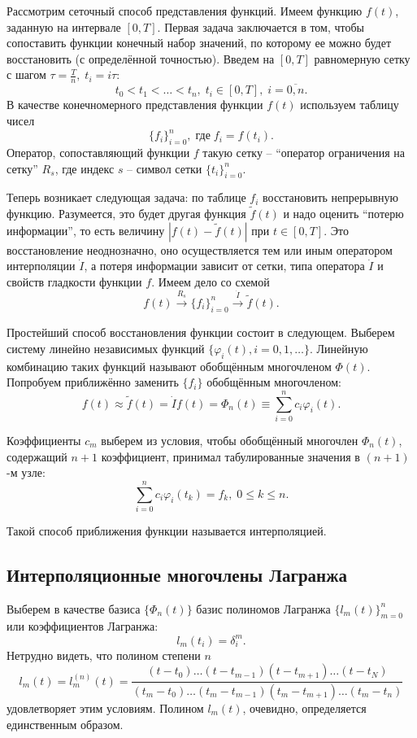 \documentclass[
11pt,
master, %
subf, %
href, %
colorlinks=true, %
times, %
]{disser}
\begin{document}
Рассмотрим сеточный способ представления функций. Имеем функцию $f(t)$, заданную на интервале $[0,T]$. Первая задача заключается в том, чтобы сопоставить функции конечный набор значений, по которому ее можно будет восстановить (с определённой точностью). Введем на $[0,T]$ равномерную сетку с шагом $\tau=\frac{T}{n},\;t_i = i\tau$:
$$t_0<t_1<\ldots<t_n,\;t_i\in[0,T],\;i=\overline{0,n}.$$
В качестве конечномерного представления функции $f(t)$ используем таблицу чисел
$$\{f_i\}^n_{i=0},\;\text{где}\; f_i=f(t_i).$$
Оператор, сопоставляющий функции $f$ такую сетку -- ``оператор ограничения на сетку'' $R_s$, где индекс $s$ -- символ сетки $\{t_i\}_{i=0}^n$.

Теперь возникает следующая задача: по таблице ${f_i}$ восстановить непрерывную функцию. Разумеется, это будет другая функция $\tilde{f}(t)$ и надо оценить ``потерю информации'', то есть величину $|f(t)-\tilde{f}(t)|$ при $t\in[0,T]$. Это восстановление неоднозначно, оно осуществляется тем или иным оператором интерполяции $\dot{I}$, а потеря информации зависит от сетки, типа оператора $\dot{I}$ и свойств гладкости функции $f$. Имеем дело со схемой
$$f(t) \xrightarrow[]{R_s} \{f_i\}^n_{i=0} \xrightarrow[]{\dot{I}} \tilde{f}(t).$$

Простейший способ восстановления функции состоит в следующем. Выберем систему линейно независимых функций $\{\varphi_i(t),i=0,1,\ldots\}$. Линейную комбинацию таких функций называют обобщённым многочленом $\Phi(t)$. Попробуем приближённо заменить $\{f_i\}$ обобщённым многочленом:
$$f(t)\approx\tilde{f}(t) = \dot{I}f(t) = \Phi_n(t)\equiv \sum_{i=0}^{n} c_i\varphi_i(t).$$

Коэффициенты $c_m$ выберем из условия, чтобы обобщённый многочлен $\Phi_n(t)$, содержащий $n+1$ коэффициент, принимал табулированные значения в $(n+1)$-м узле:
$$\sum_{i=0}^{n}c_i\varphi_i(t_k)=f_k,\;0\leq k\leq n.$$

Такой способ приближения функции называется интерполяцией.

\subsection{Интерполяционные многочлены Лагранжа}
Выберем в качестве базиса $\{\Phi_n(t)\}$ базис полиномов Лагранжа $\{l_m(t)\}_{m=0}^n$ или коэффициентов Лагранжа:
$$l_m(t_i)=\delta^m_i.$$
Нетрудно видеть, что полином степени $n$
$$l_m(t)=l_m^{(n)}(t)=\frac{(t-t_0)\ldots(t-t_{m-1})(t-t_{m+1})\ldots(t-t_N)}{(t_m-t_0)\ldots(t_m-t_{m-1})(t_m-t_{m+1})\ldots(t_m-t_n)}$$
удовлетворяет этим условиям. Полином $l_m(t)$, очевидно, определяется единственным образом.
\end{document}
